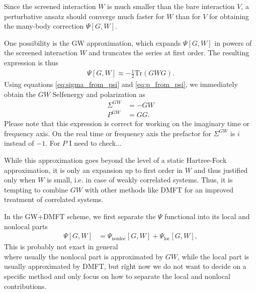 \documentclass[12pt,a4paper]{scrartcl}
\numberwithin{equation}{section}
\newcommand{\cng}[1]{{\color{red}#1}}
\begin{document}
Since the screened interaction $W$ is much smaller than the bare interaction
$V$, a perturbative ansatz should converge much faster
for $W$ than for $V$ for obtaining the many-body correction $\Psi[G,W]$.

One possibility is the GW approximation, which expands $\Psi[G,W]$ in powers of the
screened interaction $W$ and truncates the series at first order. The resulting expression
is thus
\begin{align}
\Psi[G,W] \approx -\frac{1}{2} \mathrm{Tr}(GWG).
\end{align}
Using equations \eqref{eq:sigma_from_psi} and \eqref{eq:p_from_psi},
we immediately obtain the $GW$ Selfenergy and polarization as
\begin{align}
\Sigma^{GW} &= -GW \\
P^{GW} &= GG.
\end{align}
Please note that this expression is correct for working on the imaginary
time or frequency axis. On the real time or frequency axis  the prefactor 
for $\Sigma^{GW}$ is $i$ instead of $-1$. \cng{For $P$ I need to check...}

While this approximation goes beyond the level of a static Hartree-Fock approximation,
it is only an expansion up to first order in $W$ and thus justified only when $W$ is
small, i.e. in case of weakly correlated systems. Thus, it is tempting to combine
$GW$ with other methods like DMFT for an improved treatment of correlated systems.

\bigskip

In the GW+DMFT scheme, we first separate the $\Psi$ functional into
its local and nonlocal parts
\begin{align}
\Psi[G,W] &= \Psi_{\mathrm{nonloc}}[G,W] + \Psi_{\mathrm{loc}}[G,W],
\end{align}
\cng{This is probably not exact in general}\\
where usually the nonlocal part is approximated by $GW$, while the local part is 
usually approximated by DMFT, but right now we do not want to decide on a 
specific method and only focus on how to separate the local and nonlocal 
contributions.
\end{document}
